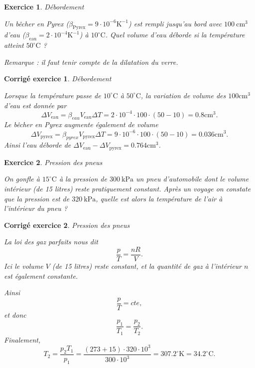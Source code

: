 \documentclass[a4paper,12pt]{article}
\newtheorem{exercice}{Exercice}
\newtheorem{corrige}{Corrig\'e exercice}
\newcommand{\cm}{\mathrm{cm}}
\newcommand{\K}{\mathrm{K}}
\newcommand{\C}{\mathrm{C}}
\newcommand{\oC}{^\circ\C}
\begin{document}
\begin{exercice}{Débordement}

Un bêcher en Pyrex ($\beta_\mathrm{Pyrex}=9\cdot10^{-6}\K^{-1}$) est rempli jusqu'au bord avec $100\ \cm^3$ d'eau ($\beta_\mathrm{eau}=2\cdot10^{-4}\K^{-1}$) à $10\oC$.
Quel volume d'eau déborde si la température atteint $50\oC$ ?

Remarque : il faut tenir compte de la dilatation du verre.
\end{exercice}

\begin{corrige}{Débordement}

Lorsque la température passe de $10\oC$ à $50\oC$, la variation de volume 
des $100\cm^3$ d'eau est donnée par 
\begin{equation}
\Delta V_\mathrm{eau}=\beta_{eau}V_\mathrm{eau}\Delta T=2\cdot 10^{-4}\cdot 100\cdot(50-10)=0.8\cm^3.
\end{equation}
Le bêcher en Pyrex augmente également de volume
\begin{equation}
\Delta V_\mathrm{pyrex}=\beta_{pyrex}V_\mathrm{pyrex}\Delta T=9\cdot 10^{-6}\cdot 100\cdot(50-10)=0.036\cm^3.
\end{equation}
Ainsi l’eau déborde de $\Delta V_\mathrm{eau}-\Delta V_\mathrm{pyrex}=0.764\cm^3$.
\end{corrige}

\begin{exercice}{Pression des pneus}

On gonfle à $15\oC$ à la pression de $300\ \mathrm{kPa}$ un pneu d’automobile dont le volume intérieur
(de 15 litres) reste pratiquement constant.
Après un voyage on constate que la pression est de $320\ \mathrm{kPa}$, quelle est alors la température de l’air à
l’intérieur du pneu ?
\end{exercice}

\begin{corrige}{Pression des pneus}
    
La loi des gaz parfaits nous dit
\begin{equation}
\frac{p}{T}=\frac{nR}{V}.
\end{equation}
Ici le volume $V$ (de 15 litres) reste constant, et la quantité de gaz à l’intérieur $n$ est également constante.

Ainsi 
\begin{equation}
\frac{p}{T}=cte,
\end{equation}
et donc
\begin{equation}
\frac{p_1}{T_1}=\frac{p_2}{T_2}.
\end{equation}
Finalement,
\begin{equation}
T_2=\frac{p_2T_1}{p_1}=\frac{(273+15)\cdot 320\cdot 10^3}{300\cdot 10^3}=307.2^\circ\K=34.2\oC.
\end{equation}

\end{corrige}
\end{document}
